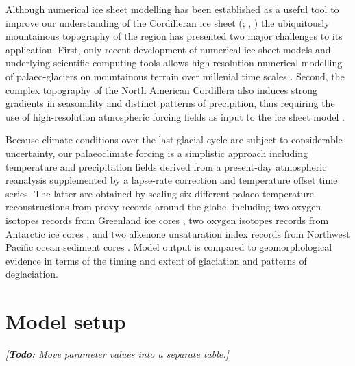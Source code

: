 \documentclass[tc, manuscript]{copernicus}
\newcommand{\todo}[1]{\emph{[\textbf{Todo:} #1]}}
\begin{document}
Although numerical ice sheet modelling has been established as a useful tool to
improve our understanding of the Cordilleran ice sheet
    (\citealp[p.~227]{Jackson.Clague.1991}; \citealp{Robert.1991},
     \citealp{Marshall.etal.2000})
the ubiquitously mountainous
topography of the region has presented two major challenges to its application.
First, only recent development of numerical ice sheet models and underlying
scientific computing tools \citep{Bueler.Brown.2009, Balay.etal.2014} allows
high-resolution numerical modelling of palaeo-glaciers on mountainous terrain
over millenial time scales \citep[e.g.,][]{Golledge.etal.2012}. Second, the
complex
topography of the North American Cordillera also induces strong gradients in
seasonality and distinct patterns of precipition, thus requiring the use of
high-resolution atmospheric forcing fields as input to the ice sheet model
\citep{Seguinot.etal.2014}.

Because climate conditions over the last glacial cycle are subject to
considerable uncertainty, our palaeoclimate forcing is a simplistic approach
including temperature and precipitation fields derived from a
present-day atmospheric reanalysis \citep{Mesinger.etal.2006,
Seguinot.etal.2014} supplemented by a lapse-rate correction
and temperature offset time series. The latter are obtained by scaling six
different palaeo-temperature reconstructions from proxy records around the
globe, including two oxygen isotopes records from Greenland ice cores
\citep{Dansgaard.etal.1993, Andersen.etal.2004}, two oxygen isotopes
records from Antarctic ice cores \citep{Petit.etal.1999,Jouzel.etal.2007},
and two alkenone unsaturation index records from Northwest Pacific ocean
sediment cores \citep{Herbert.etal.2001}. Model output is compared to
geomorphological evidence in terms of the timing and extent of glaciation and
patterns of deglaciation.


\section{Model setup}
\label{sec:model}


\todo{Move parameter values into a separate table.}
\end{document}
